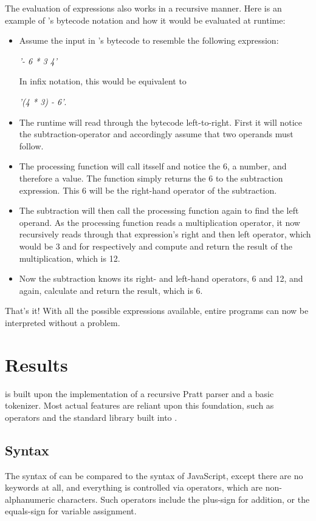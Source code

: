 \documentclass[12pt,a4paper]{article}
\newcommand{\expr}[1] {
    \begin{center}
        #1
    \end{center}
}
\begin{document}
The evaluation of expressions also works in a recursive manner. Here is an 
example of \name's bytecode notation and how it would be evaluated at runtime:
\begin{itemize}
    \item Assume the input in \name's bytecode to resemble the following expression: 
        \expr{\emph{'- 6 * 3 4'}}
        In infix notation, this would be equivalent to 
        \expr{\emph{'(4 * 3) - 6'}.}
    \item The runtime will read through the bytecode left-to-right. First it will
        notice the subtraction-operator and accordingly assume that two
        operands must follow.
    \item The processing function will call itsself
        and notice the 6, a number, and therefore a value. The function simply returns the 6
        to the subtraction expression. This 6 will be the right-hand operator
        of the subtraction.
    \item The subtraction will then call the processing function again to find
        the left operand. As the processing function reads a multiplication operator,
        it now recursively reads through that expression's right and then left
        operator, which would be 3 and for respectively and compute and return
        the result of the multiplication, which is 12.
    \item Now the subtraction knows its right- and left-hand operators, 6 and 12,
        and again, calculate and return the result, which is 6.
\end{itemize}

That's it! With all the possible expressions available, entire programs
can now be interpreted without a problem.

\section{Results}

\name is built upon the implementation of a recursive Pratt
parser and a basic tokenizer. Most actual features are reliant upon this
foundation, such as operators and the standard library built into \name.

\subsection{Syntax}
The syntax of \name can be compared to the syntax of JavaScript, except
there are no keywords at all, and everything is controlled via operators,
which are non-alphanumeric characters. Such operators include the plus-sign 
for addition, or the equals-sign for variable assignment.
\end{document}
